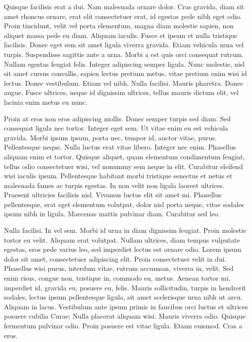 Quisque facilisis erat a dui. Nam malesuada ornare dolor. Cras gravida, diam sit amet rhoncus ornare, erat elit consectetuer erat, id egestas pede nibh eget odio. Proin tincidunt, velit vel porta elementum, magna diam molestie sapien, non aliquet massa pede eu diam. Aliquam iaculis. Fusce et ipsum et nulla tristique facilisis. Donec eget sem sit amet ligula viverra gravida. Etiam vehicula urna vel turpis. Suspendisse sagittis ante a urna. Morbi a est quis orci consequat rutrum. Nullam egestas feugiat felis. Integer adipiscing semper ligula. Nunc molestie, nisl sit amet cursus convallis, sapien lectus pretium metus, vitae pretium enim wisi id lectus. Donec vestibulum. Etiam vel nibh. Nulla facilisi. Mauris pharetra. Donec augue. Fusce ultrices, neque id dignissim ultrices, tellus mauris dictum elit, vel lacinia enim metus eu nunc.

Proin at eros non eros adipiscing mollis. Donec semper turpis sed diam. Sed consequat ligula nec tortor. Integer eget sem. Ut vitae enim eu est vehicula gravida. Morbi ipsum ipsum, porta nec, tempor id, auctor vitae, purus. Pellentesque neque. Nulla luctus erat vitae libero. Integer nec enim. Phasellus aliquam enim et tortor. Quisque aliquet, quam elementum condimentum feugiat, tellus odio consectetuer wisi, vel nonummy sem neque in elit. Curabitur eleifend wisi iaculis ipsum. Pellentesque habitant morbi tristique senectus et netus et malesuada fames ac turpis egestas. In non velit non ligula laoreet ultrices. Praesent ultricies facilisis nisl. Vivamus luctus elit sit amet mi. Phasellus pellentesque, erat eget elementum volutpat, dolor nisl porta neque, vitae sodales ipsum nibh in ligula. Maecenas mattis pulvinar diam. Curabitur sed leo.

Nulla facilisi. In vel sem. Morbi id urna in diam dignissim feugiat. Proin molestie tortor eu velit. Aliquam erat volutpat. Nullam ultrices, diam tempus vulputate egestas, eros pede varius leo, sed imperdiet lectus est ornare odio. Lorem ipsum dolor sit amet, consectetuer adipiscing elit. Proin consectetuer velit in dui. Phasellus wisi purus, interdum vitae, rutrum accumsan, viverra in, velit. Sed enim risus, congue non, tristique in, commodo eu, metus. Aenean tortor mi, imperdiet id, gravida eu, posuere eu, felis. Mauris sollicitudin, turpis in hendrerit sodales, lectus ipsum pellentesque ligula, sit amet scelerisque urna nibh ut arcu. Aliquam in lacus. Vestibulum ante ipsum primis in faucibus orci luctus et ultrices posuere cubilia Curae; Nulla placerat aliquam wisi. Mauris viverra odio. Quisque fermentum pulvinar odio. Proin posuere est vitae ligula. Etiam euismod. Cras a eros.

